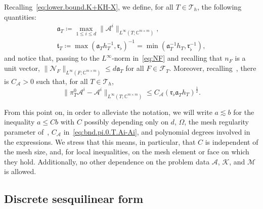 \documentclass[11pt,a4paper]{article}
\theoremstyle{plain}
\theoremstyle{remark}
\theoremstyle{definition}
\newcommand{\Complex}{\mathbb{C}}
\newcommand{\Th}{\mathcal{T}_h}
\newcommand{\FT}{\mathcal{F}_T}
\newcommand{\lproj}[2]{\pi^{#1}_{#2}}
\newcommand{\norm}[2]{\|#2\|_{#1}}
\newcommand{\Aref}[1][T]{\mathfrak{a}_{#1}}
\newcommand{\tref}{\mathfrak{t}_T}
\newcommand{\Kmin}{\mathfrak{r}_\flat}
\begin{document}
Recalling~\eqref{eq:lower.bound.K+KH-X}, we define, for all $T \in \Th$, the following quantities:
\begin{gather}\label{eq:Aref.tref}
  \Aref
  \coloneqq
  \max_{1\le i \le d} \norm{L^\infty(T; \Complex^{m\times m})}{\mathcal{A}^i},
  \\ \label{eq:tauT}
  \tref
  \coloneqq
  \max(\Aref h_T^{-1}, \Kmin)^{-1}
  = \min(\Aref^{-1} h_T, \Kmin^{-1}),
\end{gather}
and notice that, passing to the $L^\infty$-norm in~\eqref{eq:NF} and recalling that $n_F$ is a unit vector,
$\norm{L^\infty(F;\Complex^{m\times m})}{\mathcal{N}_F} \le d \Aref$ for all $F \in \FT$.
Moreover, recalling~\cite[Eq.~(60.27)]{Ern.Guermond:21*2}, there is $C_{\mathcal{A}} > 0$ such that, for all $T \in \Th$,
\begin{equation}\label{eq:bnd.pi.0.T.Ai-Ai}
  \norm{L^\infty(T;\Complex^{m\times m})}{\lproj{0}{T} \mathcal{A}^i - \mathcal{A}^i}
  \le C_{\mathcal{A}} \left(
  \Kmin \Aref h_T
  \right)^{\frac12}.
\end{equation}

From this point on, in order to alleviate the notation, we will write $a \lesssim b$ for the inequality $a\le Cb$ with $C$ possibly depending only on $d$, $\Omega$, the mesh regularity parameter of~\cite[Definition 1.9]{Di-Pietro.Droniou:20}, $C_{\mathcal{A}}$ in~\eqref{eq:bnd.pi.0.T.Ai-Ai}, and polynomial degrees involved in the expressions.
We stress that this means, in particular, that $C$ is independent of the mesh size, and, for local inequalities, on the mesh element or face on which they hold.
Additionally, no other dependence on the problem data $\mathcal{A}$, $\mathcal{K}$, and $\mathcal{M}$ is allowed.

\subsection{Discrete sesquilinear form}
\end{document}

